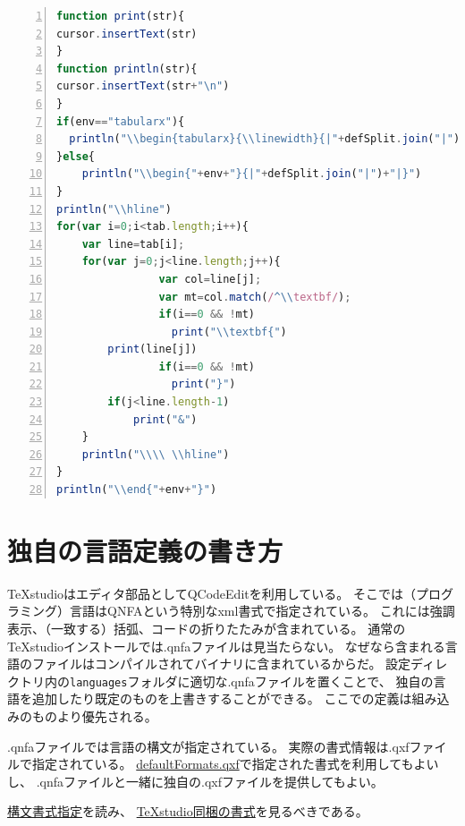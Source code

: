 \begin{lstlisting}[frame=single,language=JavaScript,breaklines=true,numbers=left]
function print(str){
cursor.insertText(str)
}
function println(str){
cursor.insertText(str+"\n")
}
if(env=="tabularx"){
  println("\\begin{tabularx}{\\linewidth}{|"+defSplit.join("|")+"|}")
}else{
    println("\\begin{"+env+"}{|"+defSplit.join("|")+"|}")
}
println("\\hline")
for(var i=0;i<tab.length;i++){
    var line=tab[i];
    for(var j=0;j<line.length;j++){
                var col=line[j];
                var mt=col.match(/^\\textbf/);
                if(i==0 && !mt)
                  print("\\textbf{")
        print(line[j])
                if(i==0 && !mt)
                  print("}")
        if(j<line.length-1)
            print("&")
    }
    println("\\\\ \\hline")
}
println("\\end{"+env+"}")
\end{lstlisting}

\section{独自の言語定義の書き方}

TeXstudioはエディタ部品としてQCodeEditを利用している。
そこでは（プログラミング）言語はQNFAという特別なxml書式で指定されている。
これには強調表示、（一致する）括弧、コードの折りたたみが含まれている。
通常のTeXstudioインストールでは.qnfaファイルは見当たらない。
なぜなら含まれる言語のファイルはコンパイルされてバイナリに含まれているからだ。
設定ディレクトリ内の\verb+languages+フォルダに適切な.qnfaファイルを置くことで、
独自の言語を追加したり既定のものを上書きすることができる。
ここでの定義は組み込みのものより優先される。

.qnfaファイルでは言語の構文が指定されている。
実際の書式情報は.qxfファイルで指定されている。
\href{https://sourceforge.net/p/texstudio/hg/ci/default/tree/utilities/qxs/}{defaultFormats.qxf}で指定された書式を利用してもよいし、
.qnfaファイルと一緒に独自の.qxfファイルを提供してもよい。

\href{http://texstudio.sourceforge.net/manual/qce/QNFA.html}{構文書式指定}を読み、
\href{https://sourceforge.net/p/texstudio/hg/ci/default/tree/utilities/qxs/}{TeXstudio同梱の書式}を見るべきである。

